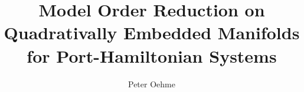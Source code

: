 

\title{Model Order Reduction on Quadrativally Embedded Manifolds for Port-Hamiltonian Systems}
\author{Peter Oehme}


    \frontmatter

    \maketitle
    \setcounter{page}{1}

    

    \tableofcontents

    \mainmatter{}

    
    
    
    
    
    

    \printbibliography[
        heading=bibintoc,
        title={Bibliography\label{chap:bibliography}}
    ]

